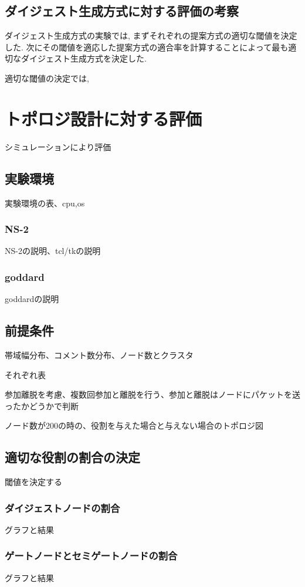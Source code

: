 \subsection{ダイジェスト生成方式に対する評価の考察}
ダイジェスト生成方式の実験では, まずそれぞれの提案方式の適切な閾値を決定した. 次にその閾値を適応した提案方式の適合率を計算することによって最も適切なダイジェスト生成方式を決定した.

適切な閾値の決定では,


\section{トポロジ設計に対する評価}
シミュレーションにより評価

\subsection{実験環境}
実験環境の表、cpu,os

\subsubsection{NS-2}
NS-2の説明、tcl/tkの説明

\subsubsection{goddard}
goddardの説明

\subsection{前提条件}
帯域幅分布、コメント数分布、ノード数とクラスタ

それぞれ表

参加離脱を考慮、複数回参加と離脱を行う、参加と離脱はノードにパケットを送ったかどうかで判断

ノード数が200の時の、役割を与えた場合と与えない場合のトポロジ図

\subsection{適切な役割の割合の決定}
閾値を決定する

\subsubsection{ダイジェストノードの割合}
グラフと結果

\subsubsection{ゲートノードとセミゲートノードの割合}
グラフと結果

